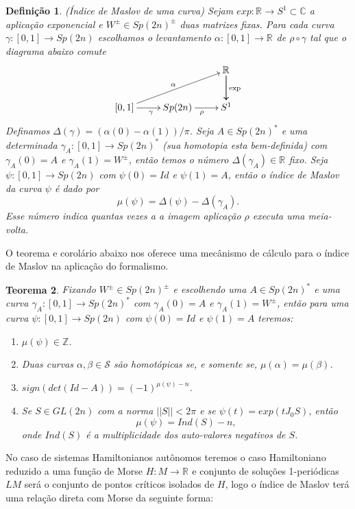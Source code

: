 \documentclass[12pt]{book}
\newtheorem{teorema}{Teorema}[section]
\newtheorem{definicao}[teorema]{Definição}
\newcommand{\real}[1]{\mathbb{R}^{#1}}
\begin{document}
	\begin{definicao}
		(Índice de Maslov de uma curva) Sejam $exp:\real{} \to S^{1} \subset \mathbb{C}$ a aplicação exponencial e $W^{\pm} \in Sp(2n)^{\pm}$ duas matrizes fixas. Para cada curva $\gamma:[0,1] \to Sp(2n)$ escolhamos o levantamento $\alpha:[0,1] \to \real{}$ de $\rho\circ \gamma$ tal que o diagrama abaixo comute
		$$
		\xymatrix{
			& & \real{}\ar[d]\ar[d]^{\text{exp}}
			\\
			[0,1 ]\ar[urr]^{\alpha} \ar[r]_{\gamma} & Sp(2n) \ar[r]_{\rho} & S^{1}
		}
		$$	
		Definamos $\varDelta(\gamma) = (\alpha(0) - \alpha(1))/\pi$. Seja $A \in Sp(2n)^{*}$ e uma determinada $\gamma_{A}:[0,1] \to Sp(2n)^{*}$ (sua homotopia esta bem-definida) com $\gamma_{A}(0) = A$ e $\gamma_{A}(1) = W^{\pm}$, então temos o número $\varDelta(\gamma_{A}) \in \real{}$ fixo.
		Seja $\psi:[0,1] \to Sp(2n)$ com $\psi(0)=Id$ e $\psi(1)=A$, então o índice de Maslov da curva $\psi$ é dado por
		$$
		\mu(\psi) = \varDelta(\psi) - \varDelta(\gamma_{A}).
		$$
		Esse número indica quantas vezes a a imagem aplicação $\rho$ executa uma meia-volta.
	\end{definicao}
	
	O teorema e corolário abaixo nos oferece uma mecânismo de cálculo para o índice de Maslov na aplicação do formalismo.
	
	\begin{teorema}
		Fixando $W^{\pm} \in Sp(2n)^{\pm}$ e escolhendo uma $A \in Sp(2n)^{*}$ e uma curva $\gamma_{A}:[0,1] \to Sp(2n)^{*}$ com $\gamma_{A}(0) = A$ e $\gamma_{A}(1) = W^{\pm}$, então para uma curva  $\psi:[0,1] \to Sp(2n)$ com $\psi(0) = Id$ e $\psi(1) = A$ teremos:
		\begin{enumerate}
			\item $\mu(\psi) \in \mathbb{Z}$.
			\item Duas curvas $\alpha, \beta \in \mathcal{S}$ são homotópicas se, e somente se, $\mu(\alpha) = \mu(\beta)$.
			\item $sign(det(Id - A)) = (-1)^{\mu(\psi)-n}$.
			\item Se $S \in GL(2n)$ com a norma $||S|| < 2\pi$ e se $\psi(t) = exp(tJ_{0}S)$, então 
			$$
			\mu(\psi) = Ind(S) - n,
			$$
			onde $Ind(S)$ é a multiplicidade dos auto-valores negativos de $S$.
		\end{enumerate}
	\end{teorema}
	
	No caso de sistemas Hamiltonianos autônomos teremos o caso Hamiltoniano reduzido a uma função de Morse $H:M\to \real{}$ e conjunto de soluções 1-periódicas $LM$ será o conjunto de pontos críticos isolados de $H$, logo o índice de Maslov terá uma relação direta com Morse da seguinte forma:
	
\end{document}
